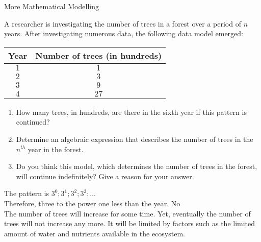 \begin{wex}{More Mathematical Modelling}
{A researcher is investigating the number of trees in a forest over a period of $n$ years. After investigating numerous data, the following data model emerged:
\begin{center}
\begin{tabular}{|c|c|}\hline
Year& Number of trees (in hundreds)\\\hline
$1$ & $1$\\\hline
$2$ & $3$ \\\hline
$3$ & $9$ \\\hline
$4$ & $27$ \\\hline
\end{tabular}
\end{center}
\begin{enumerate}
\item{How many trees, in hundreds, are there in the sixth year if this pattern is
continued?}
\item{Determine an algebraic expression that describes the number of trees in the $n^{th}$ year in the forest.}
\item{Do you think this model, which determines the number of trees in the forest, will continue indefinitely? Give a reason for your answer.}
\end{enumerate}
}{
The pattern is $3^0; 3^1; 3^2; 3^3;\ldots$\\
Therefore, three to the power one less than the year.
No\\
The number of trees will increase for some time. Yet, eventually the number of trees will not increase any more. It will be limited by factors such as the limited amount of water and nutrients available in the ecosystem.
}
\end{wex}

